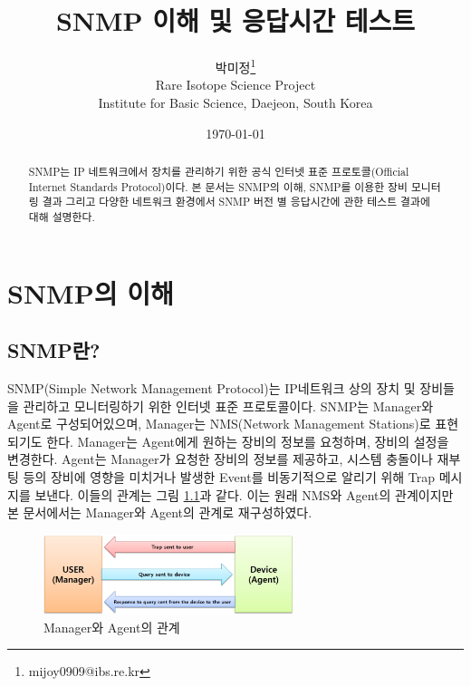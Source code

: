 \documentclass[11pt
  , a4paper
  , article
  , oneside
]{memoir}
\begin{document}
\newcommand{\technumber}{
  RAON Control-Document Series\\
  Revision : v1.0,   Release : Jan. 02. 2015}
\title{\textbf{SNMP 이해 및 응답시간 테스트}}

\author{박미정\thanks{mijoy0909@ibs.re.kr} \\

  Rare Isotope Science Project\\
  Institute for Basic Science, Daejeon, South Korea
}
\date{\today}

\renewcommand{\maketitlehooka}{\begin{flushright}\textsf{\technumber}\end{flushright}}

\maketitle

\begin{abstract}
SNMP는 IP 네트워크에서 장치를 관리하기 위한 공식 인터넷 표준 프로토콜(Official Internet Standards Protocol)\citep{oisp}이다. 본 문서는 SNMP의 이해, SNMP를 이용한 장비 모니터링 결과 그리고 다양한 네트워크 환경에서 SNMP 버전 별 응답시간에 관한 테스트 결과에 대해 설명한다. 
\end{abstract}

\chapter{SNMP의 이해}
\section{SNMP란?}
SNMP(Simple Network Management Protocol)는 IP네트워크 상의 장치 및 장비들을 관리하고 모니터링하기 위한 인터넷 표준 프로토콜이다. SNMP는 Manager와 Agent로 구성되어있으며, Manager는 NMS(Network Management Stations)로 표현되기도 한다. Manager는 Agent에게 원하는 장비의 정보를 요청하며, 장비의 설정을 변경한다. Agent는 Manager가 요청한 장비의 정보를 제공하고, 시스템 충돌이나 재부팅 등의 장비에 영향을 미치거나 발생한 Event를 비동기적으로 알리기 위해 Trap 메시지를 보낸다. 이들의 관계는 그림 \ref{fig:relationship_m_a}\citep{essential_snmp}과 같다. 이는 원래 NMS와 Agent의 관계이지만 본 문서에서는 Manager와 Agent의 관계로 재구성하였다.
\begin{figure}[h!]
  \centering
  \includegraphics[width=0.65\textwidth]{./images/relationship_m_a.eps}
  \caption{Manager와 Agent의 관계}
  \label{fig:relationship_m_a}   
\end{figure}
\end{document}
